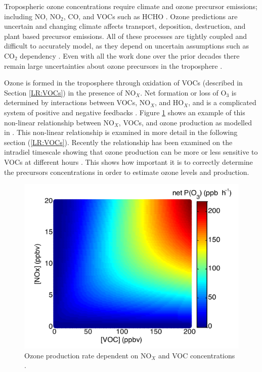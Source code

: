     Tropospheric ozone concentrations require climate and ozone precursor emissions; including NO, NO$_2$, CO, and VOCs such as HCHO \parencite{Atkinson2000, Young2013, Marvin2017}. 
    Ozone predictions are uncertain and changing climate affects transport, deposition, destruction, and plant based precursor emissions.
    All of these processes are tightly coupled and difficult to accurately model, as they depend on uncertain assumptions such as CO$_2$ dependency \parencite{Young2013}.
    Even with all the work done over the prior decades there remain large uncertainties about ozone precursors in the troposphere \parencite{Mazzuca2016}.
    
    Ozone is formed in the troposphere through oxidation of VOCs (described in Section \ref{LR:VOCs}) in the presence of NO$_X$.
    Net formation or loss of O$_3$ is determined by interactions between VOCs, NO$_X$, and HO$_X$, and is a complicated system of positive and negative feedbacks \parencite{Atkinson2000}.
    Figure \ref{LR:VOCs:fig_NOXVOCOzone} shows an example of this non-linear relationship between NO$_X$, VOCs, and ozone production as modelled in \textcite{Mazzuca2016}.
    This non-linear relationship is examined in more detail in the following section (\ref{LR:VOCs}).
    Recently the relationship has been examined on the intradiel timescale showing that ozone production can be more or less sensitive to VOCs at different hours \parencite{Mazzuca2016}.
    This shows how important it is to correctly determine the precursors concentrations in order to estimate ozone levels and production.
    
    \begin{figure}
      \includegraphics[width=.75\textwidth]{Figures/Mazzuca2016_NOxVOCOzone.png}
      \caption{Ozone production rate dependent on NO$_X$ and VOC concentrations \parencite{Mazzuca2016}.}
      \label{LR:VOCs:fig_NOXVOCOzone}
    \end{figure}
    
